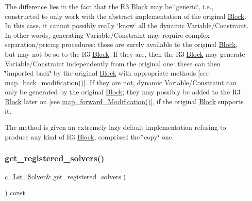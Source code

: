 The difference lies in the fact that the R3 \mbox{\hyperlink{class_s_m_spp__di__unipi__it_1_1_block}{Block}} may be \char`\"{}generic\char`\"{}, i.\+e., constructed to only work with the abstract implementation of the original \mbox{\hyperlink{class_s_m_spp__di__unipi__it_1_1_block}{Block}}. In this case, it cannot possibly really \char`\"{}know\char`\"{} all the dynamic Variable/\+Constraint. In other words, generating Variable/\+Constraint may require complex separation/pricing procedures\+: these are surely available to the original \mbox{\hyperlink{class_s_m_spp__di__unipi__it_1_1_block}{Block}}, but may not be so to the R3 \mbox{\hyperlink{class_s_m_spp__di__unipi__it_1_1_block}{Block}}. If they are, then the R3 \mbox{\hyperlink{class_s_m_spp__di__unipi__it_1_1_block}{Block}} may generate Variable/\+Constraint independently from the original one\+: these can then \char`\"{}imported back\char`\"{} by the original \mbox{\hyperlink{class_s_m_spp__di__unipi__it_1_1_block}{Block}} with appropriate methods \mbox{[}see map\+\_\+back\+\_\+modification()\mbox{]}. If they are not, dynamic Variable/\+Constraint can only be generated by the original \mbox{\hyperlink{class_s_m_spp__di__unipi__it_1_1_block}{Block}}; they may possibly be added to the R3 \mbox{\hyperlink{class_s_m_spp__di__unipi__it_1_1_block}{Block}} later on \mbox{[}see \mbox{\hyperlink{class_s_m_spp__di__unipi__it_1_1_block_a26eeed482e287e1f8a384826c789f9e0}{map\+\_\+forward\+\_\+\+Modification()}}\mbox{]}, if the original \mbox{\hyperlink{class_s_m_spp__di__unipi__it_1_1_block}{Block}} supports it.

The method is given an extremely lazy default implementation refusing to produce any kind of R3 \mbox{\hyperlink{class_s_m_spp__di__unipi__it_1_1_block}{Block}}, comprised the \char`\"{}copy\char`\"{} one. \mbox{\label{class_s_m_spp__di__unipi__it_1_1_block_a052e250efe81b0840361e70c520bdd7f}} 
\subsubsection{\texorpdfstring{get\+\_\+registered\+\_\+solvers()}{get\_registered\_solvers()}}
{\footnotesize\ttfamily \mbox{\hyperlink{namespace_s_m_spp__di__unipi__it_aa4d2cd4385e5eb96e9807bbdc1490b3b}{c\+\_\+\+Lst\+\_\+\+Solver}}\& get\+\_\+registered\+\_\+solvers (\begin{DoxyParamCaption}\item[{void}]{ }\end{DoxyParamCaption}) const\hspace{0.3cm}{\ttfamily [inline]}}



